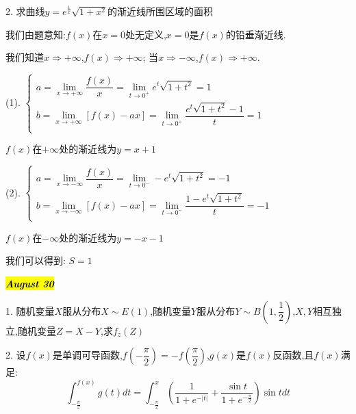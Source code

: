2. 求曲线$y=e^{\frac{1}{x}}\sqrt{1+x^2}$的渐近线所围区域的面积
\begin{solution}

	我们由题意知:$f(x)$在$x=0$处无定义,$x=0$是$f(x)$的铅垂渐近线.
	
	我们知道$x\Rightarrow +\infty$,$f(x)\Rightarrow +\infty$; 当$x\Rightarrow -\infty$,$f(x)\Rightarrow +\infty$.
	
	(1). $\left\lbrace
	\begin{array}{l}
		a=\lim\limits_{x\rightarrow+\infty}\dfrac{f(x)}{x}=\lim\limits_{t\rightarrow 0^{+}}e^{t}\sqrt{1+t^2}=1\\
		b=\lim\limits_{x\rightarrow+\infty}\left[ f(x)-ax\right]=\lim\limits_{t\rightarrow 0^{+}}\dfrac{e^{t}\sqrt{1+t^2}-1}{t}=1\\
	\end{array}
	\right. $
	
	$f(x)$在$+\infty$处的渐近线为$y=x+1$
	
	(2). $\left\lbrace
	\begin{array}{l}
		a=\lim\limits_{x\rightarrow-\infty}\dfrac{f(x)}{x}=\lim\limits_{t\rightarrow 0^{-}}-e^{t}\sqrt{1+t^2}=-1\\
		b=\lim\limits_{x\rightarrow-\infty}\left[ f(x)-ax\right]=\lim\limits_{t\rightarrow 0^{-}}\dfrac{1-e^{t}\sqrt{1+t^2}}{t}=-1\\
	\end{array}
	\right. $
	
	$f(x)$在$-\infty$处的渐近线为$y=-x-1$
	
	我们可以得到:  $S=1$
\end{solution}

\hl{\textbf{\textit{August 30}}}

1. 随机变量$X$服从分布$X\sim E(1)$,随机变量$Y$服从分布$Y\sim B(1,\dfrac{1}{2})$,$X,Y$相互独立,随机变量$Z=X-Y$,求$f_{z}(Z)$
\begin{solution}
	
\end{solution}

2. 设$f(x)$是单调可导函数,$f(-\dfrac{\pi}{2})=-f(\dfrac{\pi}{2})$,$g(x)$是$f(x)$反函数,且$f(x)$满足:
$$\int_{-\frac{\pi}{2}}^{f(x)}g(t)dt=\int_{-\frac{\pi}{2}}^{x}\left(\dfrac{1}{1+e^{-|t|}}+\dfrac{\sin t}{1+e^{-\frac{\pi}{2}}}\right)\sin tdt$$


